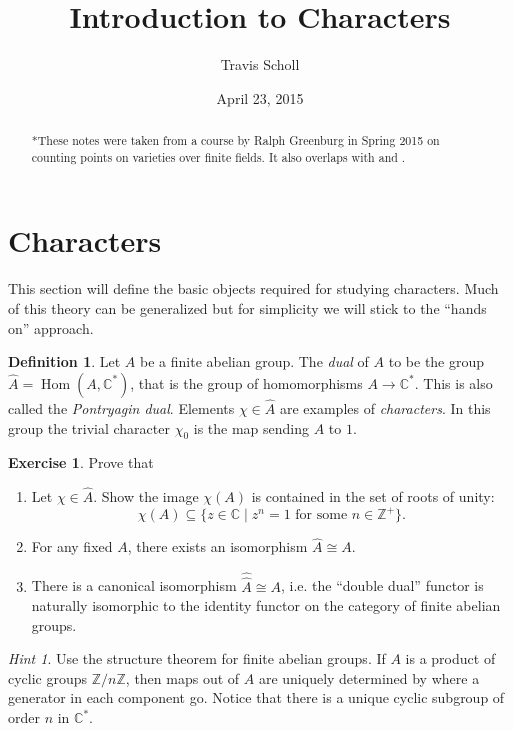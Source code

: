 \documentclass[11pt]{article}
\date{April 23, 2015}
\newcommand{\BB}[1]{\mathbb{#1}} %
\newcommand{\CC}{\BB{C}}
\newcommand{\ZZ}{\BB{Z}}
\newcommand{\st}{\mid}
\newcommand{\Hom}{\operatorname{Hom}}
\renewcommand{\hat}{\widehat}
\theoremstyle{plain}
\theoremstyle{definition}
\newtheorem{defn}[definitionCounter]{Definition}
\newtheorem{excer}[exerciseCounter]{Exercise}
\theoremstyle{remark}
\newtheorem*{hint}{Hint}
\newcommand{\mytitle}{Introduction to Characters}
\newcommand{\myauthor}{Travis Scholl}
\begin{document}
\title{\bfseries\sffamily \mytitle}
\author{\sc \myauthor }
\maketitle

\begin{abstract}
	*These notes were taken from a course by Ralph Greenburg in Spring 2015 \cite{ralphscourse} on counting points on varieties over finite fields. It also overlaps with \cite[Ch. VI]{serre2012course} and \cite{washington1997introduction}.
\end{abstract}

\section{Characters}
\hfill

This section will define the basic objects required for studying characters. Much of this theory can be generalized but for simplicity we will stick to the ``hands on'' approach.

\begin{defn}
	Let $A$ be a finite abelian group. The \emph{dual} of $A$ to be the group $\hat{A} = \Hom(A,\CC^*)$, that is the group of homomorphisms $A \to \CC^*$. This is also called the \emph{Pontryagin dual}. Elements $\chi\in\hat{A}$ are examples of \emph{characters}. In this group the trivial character $\chi_0$ is the map sending $A$ to $1$.
\end{defn}

\begin{excer}\label{ex:charbasics}
	Prove that
	\begin{enumerate}[label=(\alph*)]
		\item Let $\chi\in\hat{A}$. Show the image $\chi(A)$ is contained in the set of roots of unity:
		$$
			\chi(A) \subseteq \{z\in\CC \st z^n=1 \text{ for some $n\in\ZZ^+$}\}.
		$$
		\item For any fixed $A$, there exists an isomorphism $\hat{A} \cong A$.
		\item There is a canonical isomorphism $\hat{\hat{A}} \cong A$, i.e. the ``double dual'' functor is naturally isomorphic to the identity functor on the category of finite abelian groups.
	\end{enumerate}
	\begin{hint}
		Use the structure theorem for finite abelian groups. If $A$ is a product of cyclic groups $\ZZ/n\ZZ$, then maps out of $A$ are uniquely determined by where a generator in each component go. Notice that there is a unique cyclic subgroup of order $n$ in $\CC^*$.
	\end{hint}
\end{excer}
\end{document}
